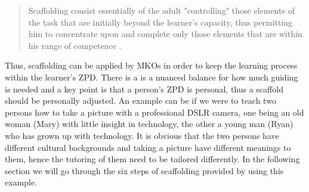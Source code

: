 \begin{quote}Scaffolding consist essentially of the adult "controlling" those elements of the task that are initially beyond the learner’s capacity, thus permitting him to concentrate upon and complete only those elements that are within his range of competence \citep[p. 90]{wood1976role}.
\end{quote}

Thus, scaffolding can be applied by MKOs in order to keep the learning process within the learner’s ZPD. There is a is a nuanced balance for how much guiding is needed and a key point is that a person's ZPD is personal, thus a scaffold should be personally adjusted. An example can be if we were to teach two persons how to take a picture with a professional DSLR camera, one being an old woman (Mary) with little insight in technology, the other a young man (Ryan) who has grown up with technology. It is obvious that the two persons have different cultural backgrounds and taking a picture have different meanings to them, hence the tutoring of them need to be tailored differently. In the following section we will go through the six steps of scaffolding provided by \citet{wood1976role} using this example.

